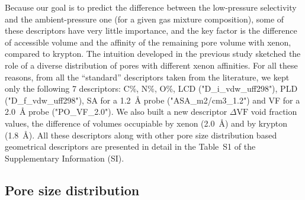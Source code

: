 \documentclass[main]{subfiles}
\begin{document}
Because our goal is to predict the difference between the low-pressure selectivity and the ambient-pressure one (for a given gas mixture composition), some of these descriptors have very little importance, and the key factor is the difference of accessible volume and the affinity of the remaining pore volume with xenon, compared to krypton. The intuition developed in the previous study sketched the role of a diverse distribution of pores with different xenon affinities.\autocite{Ren_2021} For all these reasons, from all the ``standard'' descriptors taken from the literature, we kept only the following 7 descriptors: C\%, N\%, O\%, LCD ("D\_i\_vdw\_uff298"), PLD ("D\_f\_vdw\_uff298"), SA for a \SI{1.2}{\angstrom} probe ("ASA\_m2/cm3\_1.2") and VF for a \SI{2.0}{\angstrom} probe ("PO\_VF\_2.0"). We also built a new descriptor $\Delta \text{VF}$ void fraction values, the difference of volumes occupiable by xenon (\SI{2.0}{\angstrom}) and by krypton (\SI{1.8}{\angstrom}). All these descriptors along with other pore size distribution based geometrical descriptors are presented in detail in the Table~S1 of the Supplementary Information (SI).

\subsection{Pore size distribution}
\end{document}
